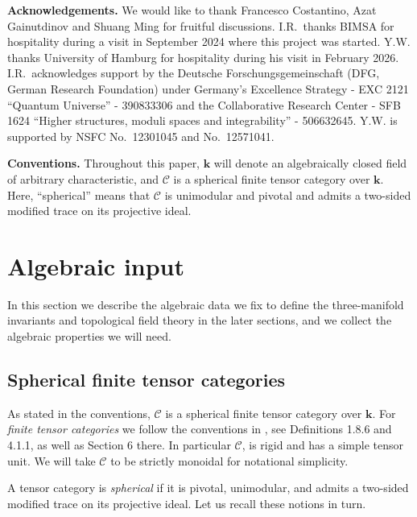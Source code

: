 \documentclass[11pt]{amsart}
\theoremstyle{definition}
\numberwithin{equation}{section}
\def\cC{\mathcal{C}}
\def\kk{{\bm{k}}}
\begin{document}
\noindent
\textbf{Acknowledgements.}
We would like to thank Francesco Costantino, Azat Gainutdinov and Shuang Ming for fruitful discussions.
I.R.\ thanks BIMSA for hospitality during a visit in September 2024 where this project was started.
Y.W. thanks University of Hamburg for hospitality during his visit in February 2026.
I.R.\ acknowledges support by the Deutsche Forschungsgemeinschaft (DFG, German Research Foundation) under Germany's Excellence Strategy - EXC 2121 ``Quantum Universe'' - 390833306 and the Collaborative Research Center - SFB 1624 ``Higher structures, moduli spaces and integrability'' - 506632645.
Y.W. is supported by NSFC No.~12301045 and No.~12571041. 

\bigskip

\noindent
\textbf{Conventions.}
Throughout this paper, $\kk$ will denote an algebraically closed field of arbitrary characteristic, and $\cC$ is a spherical finite tensor category over $\kk$.
Here, ``spherical'' means that $\cC$ is unimodular and pivotal and admits a two-sided modified trace on its projective ideal.

\section{Algebraic input}

In this section we describe the algebraic data we fix to define the three-manifold invariants and topological field theory in the later sections, and we collect the algebraic properties we will need.

\subsection{Spherical finite tensor categories}\label{sec:spherical}

As stated in the conventions, $\cC$ is a spherical finite tensor category over $\kk$. 
For \textit{finite tensor categories} we follow the conventions in \cite{EGNO}, see Definitions 1.8.6 and 4.1.1, as well as Section 6 there. In particular $\cC$, is rigid and has a simple tensor unit. We will take $\cC$ to be strictly monoidal for notational simplicity.

A tensor category is \textit{spherical} if it is pivotal, unimodular, and admits a two-sided modified trace on its projective ideal. Let us recall these notions in turn.
\end{document}
